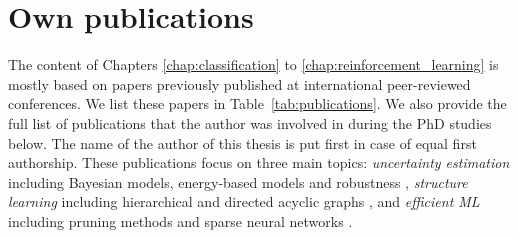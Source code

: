 \section{Own publications}

The content of Chapters \ref{chap:classification} to \ref{chap:reinforcement_learning} is mostly based on papers previously published at international peer-reviewed conferences. We list these papers in Table~\ref{tab:publications}.
We also provide the full list of publications that the author was involved in during the PhD studies below. The name of the author of this thesis is put first in case of equal first authorship. These publications focus on three main topics: \emph{uncertainty estimation} including Bayesian models, energy-based models and robustness \citep{charpentier2020,NatPN2021,robustness-uncertainty-dirichlet,charpentier2023training,graph-postnet,uceloss,charpentier2022uncertainty-rl,ood_ebm,ayle2022robustness-sparse}, \emph{structure learning} including hierarchical and directed acyclic graphs \cite{charpentier2022dpdag,charpentier2019tsd,zugner2022endtoend,bonald2020scikitnetwork}, and \emph{efficient ML} including pruning methods and sparse neural networks \cite{rachwan2022earlycrop,ayle2022robustness-sparse,getzner2023accuracy}.

\renewcommand{\bibsection}{}
